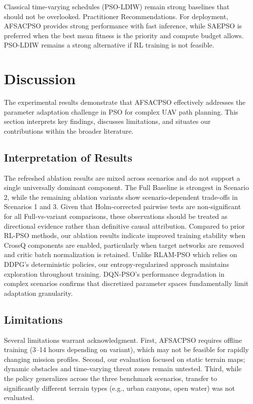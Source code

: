 \documentclass[final,5p,times]{elsarticle}
\begin{document}
\begin{table}[t]
{Classical time-varying schedules (PSO-LDIW) remain strong baselines that should not be overlooked. Practitioner Recommendations. For deployment, AFSACPSO provides strong performance with fast inference, while SAEPSO is preferred when the best mean fitness is the priority and compute budget allows.
PSO-LDIW remains a strong alternative if RL training is not feasible. \section{Discussion}
\label{sec:discussion} The experimental results demonstrate that AFSACPSO effectively addresses the parameter adaptation challenge in PSO for complex UAV path planning.
This section interprets key findings, discusses limitations, and situates our contributions within the broader literature. \subsection{Interpretation of Results} The refreshed ablation results are mixed across scenarios and do not support a single universally dominant component.
The Full Baseline is strongest in Scenario 2, while the remaining ablation variants show scenario-dependent trade-offs in Scenarios 1 and 3.
Given that Holm-corrected pairwise tests are non-significant for all Full-vs-variant comparisons, these observations should be treated as directional evidence rather than definitive causal attribution. Compared to prior RL-PSO methods, our ablation results indicate improved training stability when CrossQ components are enabled, particularly when target networks are removed and critic batch normalization is retained.
Unlike RLAM-PSO \cite{Yin2023RLAMPSO} which relies on DDPG's deterministic policies, our entropy-regularized approach maintains exploration throughout training.
DQN-PSO's performance degradation in complex scenarios confirms that discretized parameter spaces fundamentally limit adaptation granularity. \subsection{Limitations} Several limitations warrant acknowledgment.
First, AFSACPSO requires offline training (3--14 hours depending on variant), which may not be feasible for rapidly changing mission profiles.
Second, our evaluation focused on static terrain maps; dynamic obstacles and time-varying threat zones remain untested.
Third, while the policy generalizes across the three benchmark scenarios, transfer to significantly different terrain types (e.g., urban canyons, open water) was not evaluated.
}
\end{table}
\end{document}
